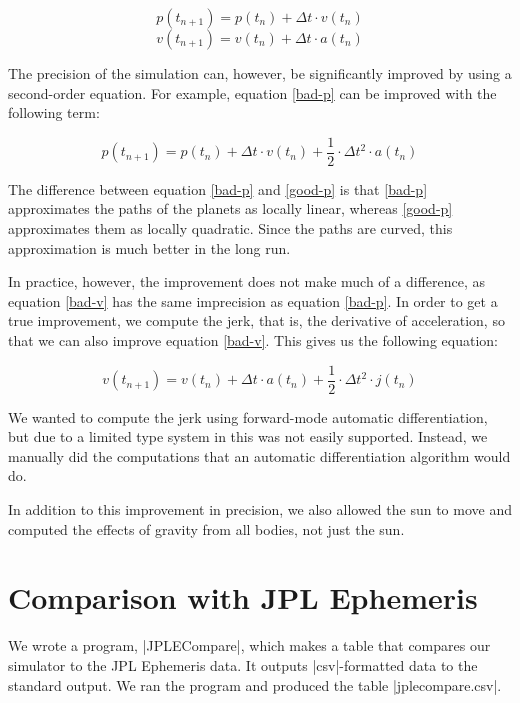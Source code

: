 \documentclass[a4paper]{article}
\begin{document}
\begin{equation} \label{bad-p}
p(t_{n+1}) = p(t_n) + \Delta t \cdot v(t_n)
\end{equation}
\begin{equation} \label{bad-v}
v(t_{n+1}) = v(t_n) + \Delta t \cdot a(t_n)
\end{equation}

The precision of the simulation can, however, be significantly improved by using a second-order equation. For example, equation \ref{bad-p} can be improved with the following term:

\begin{equation} \label{good-p}
p(t_{n+1}) = p(t_n) + \Delta t \cdot v(t_n) + \frac{1}{2} \cdot \Delta t^2 \cdot a(t_n)
\end{equation}

The difference between equation \ref{bad-p} and \ref{good-p} is that \ref{bad-p} approximates the paths of the planets as locally linear, whereas \ref{good-p} approximates them as locally quadratic. Since the paths are curved, this approximation is much better in the long run.

In practice, however, the improvement does not make much of a difference, as equation \ref{bad-v} has the same imprecision as equation \ref{bad-p}. In order to get a true improvement, we compute the jerk, that is, the derivative of acceleration, so that we can also improve equation \ref{bad-v}. This gives us the following equation:

\begin{equation} \label{good-v}
v(t_{n+1}) = v(t_n) + \Delta t \cdot a(t_n) + \frac{1}{2} \cdot \Delta t^2 \cdot j(t_n)
\end{equation}

We wanted to compute the jerk using forward-mode automatic differentiation, but due to a limited type system in \Fsh this was not easily supported. Instead, we manually did the computations that an automatic differentiation algorithm would do.

In addition to this improvement in precision, we also allowed the sun to move and computed the effects of gravity from all bodies, not just the sun.

\section{Comparison with JPL Ephemeris}

We wrote a program, \code|JPLECompare|, which makes a table that compares our simulator to the JPL Ephemeris data. It outputs \code|csv|-formatted data to the standard output. We ran the program and produced the table \code|jplecompare.csv|.
\end{document}
